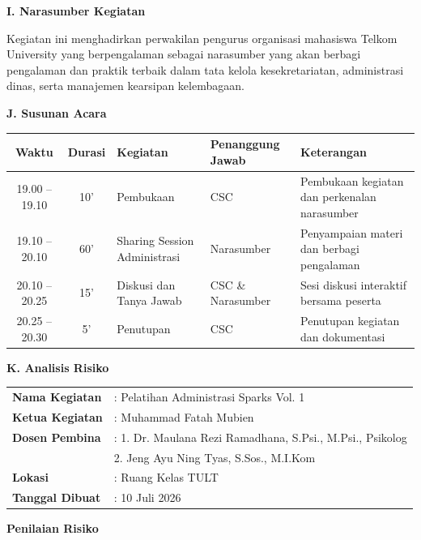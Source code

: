 \documentclass[12pt,a4paper]{article}
\begin{document}
\vspace{5pt}
\noindent\textbf{I. Narasumber Kegiatan}
\vspace{2pt}

\noindent
Kegiatan ini menghadirkan perwakilan pengurus organisasi mahasiswa Telkom University yang berpengalaman sebagai narasumber yang akan berbagi pengalaman dan praktik terbaik dalam tata kelola kesekretariatan, administrasi dinas, serta manajemen kearsipan kelembagaan.

\vspace{5pt}
\noindent\textbf{J. Susunan Acara}
\vspace{3pt}

\noindent
\begin{tabular}{|c|c|p{4.2cm}|p{3.2cm}|p{4.2cm}|}
\hline
\textbf{Waktu} & \textbf{Durasi} & \textbf{Kegiatan} & \textbf{Penanggung Jawab} & \textbf{Keterangan} \\ \hline
19.00 -- 19.10 & 10' & Pembukaan & CSC & Pembukaan kegiatan dan perkenalan narasumber \\ \hline
19.10 -- 20.10 & 60' & Sharing Session Administrasi & Narasumber & Penyampaian materi dan berbagi pengalaman \\ \hline
20.10 -- 20.25 & 15' & Diskusi dan Tanya Jawab & CSC \& Narasumber & Sesi diskusi interaktif bersama peserta \\ \hline
20.25 -- 20.30 & 5' & Penutupan & CSC & Penutupan kegiatan dan dokumentasi \\ \hline
\end{tabular}

\vspace{5pt}
\noindent\textbf{K. Analisis Risiko}
\vspace{2pt}

\noindent
\begin{tabular}{ll}
\textbf{Nama Kegiatan} & : Pelatihan Administrasi Sparks Vol. 1 \\
\textbf{Ketua Kegiatan} & : Muhammad Fatah Mubien \\
\textbf{Dosen Pembina} & : 1. Dr. Maulana Rezi Ramadhana, S.Psi., M.Psi., Psikolog \\
 & \phantom{: }2. Jeng Ayu Ning Tyas, S.Sos., M.I.Kom \\
\textbf{Lokasi} & : Ruang Kelas TULT \\
\textbf{Tanggal Dibuat} & : 10 Juli 2026
\end{tabular}

\vspace{4pt}
\noindent\textbf{Penilaian Risiko}
\vspace{2pt}
\end{document}
